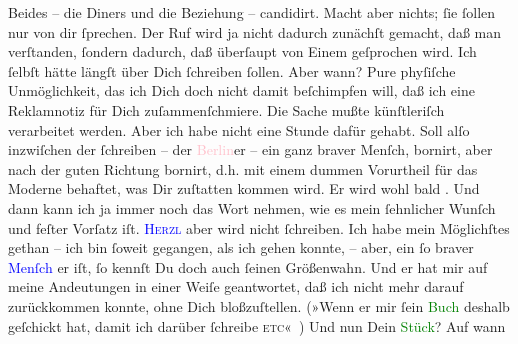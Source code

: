                Beides – die  Diners und die Beziehung –
               candidirt. Macht aber nichts; ſie ſollen nur von dir ſprechen. Der Ruf wird ja nicht
               dadurch zunächſt gemacht, daß man verſtanden, ſondern dadurch, daß überſaupt von
               Einem geſprochen wird. Ich ſelbſt hätte längſt über Dich ſchreiben ſollen. Aber wann?
               Pure phyſiſche Unmöglichkeit, das ich Dich doch nicht damit {\pb}beſchimpfen will, daß ich eine Reklamnotiz für Dich
               zuſammenſchmiere. Die Sache mußte künſtleriſch verarbeitet werden. Aber ich habe
               nicht eine Stunde dafür gehabt. Soll alſo inzwiſchen der \label{K_L02704-12v}\label{K_L02704-12h} ſchreiben – der \textcolor{pink}{Berlin}{}\ledrightnote{\textcolor{pink}{Berlin}}er
               – ein ganz braver Menſch,  bornirt, aber nach der guten Richtung bornirt, d.h. mit einem dummen
               Vorurtheil für das Moderne be{\pb}haftet, was Dir
               zuſtatten kommen wird. Er wird wohl bald \label{K_L02704-13v}\label{K_L02704-13h}. Und dann kann ich ja
               immer noch das Wort nehmen, wie es mein ſehnlicher Wunſch und feſter Vorſatz iſt. \textsc{\textcolor{blue}{Herzl}{}\ledrightnote{\textcolor{blue}{Theodor Herzl}}} aber wird nicht ſchreiben. Ich habe mein Möglichſtes gethan – ich bin ſoweit
               gegangen, als ich gehen konnte, – aber, ein ſo braver \textcolor{blue}{Menſch}{} er iſt, ſo kennſt Du doch auch
               ſeinen {\pb}Größenwahn. Und er hat mir auf meine
               Andeutungen in einer Weiſe geantwortet, daß ich nicht mehr darauf zurückkommen
               konnte, ohne Dich bloßzuſtellen. (»Wenn er mir ſein \textcolor{green}{Buch}{} deshalb geſchickt hat, damit ich darüber ſchreibe \textsc{etc}« {\dotsfour})\pend
           \pstart
           Und nun Dein \textcolor{green}{Stück}{}? Auf wann
